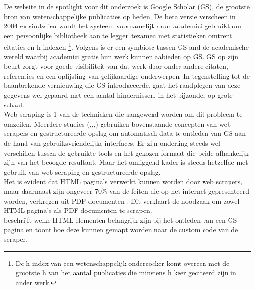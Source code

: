 De website in de spotlight voor dit onderzoek is Google Scholar (GS), de grootste bron van wetenschappelijke publicaties op heden. De beta versie verscheen in 2004 en sindsdien wordt het systeem voornamelijk door academici gebruikt om een persoonlijke bibliotheek aan te leggen tezamen met statistieken omtrent citaties en h-indexen \footnote{De h-index van een wetenschappelijk onderzoeker komt overeen met de grootste h van het aantal publicaties die minstens h keer geciteerd zijn in ander werk.}. Volgens \textcite{Oh2019} is er een symbiose tussen GS and de academische wereld waarbij academici gratis hun werk kunnen aabieden op GS. GS op zijn beurt zorgt voor goede visibiliteit van dat werk door onder andere citaten, referenties en een oplijsting van gelijkaardige onderwerpen. In tegenstelling tot de baanbrekende vernieuwing die GS introduceerde, gaat het raadplegen van deze gegevens wel gepaard met een aantal hindernissen, in het bijzonder op grote schaal.\\
Web scraping is 1 van de technieken die aangewend worden om dit probleem te omzeilen. Meerdere studies (\autocite{Pratiba2018},\autocite{Rafsanjani2022},\autocite{Amin2024},\autocite{Sulistya2024}) gebruiken bovenstaande concepten van web scrapers en gestructureerde opslag om automatisch data te ontleden van GS aan de hand van gebruiksvriendelijke interfaces. Er zijn onderling steeds wel verschillen tussen de gebruikte tools en het gekozen formaat die beide afhankelijk zijn van het beoogde resultaat. Maar het omliggend kader is steeds hetzelfde met gebruik van web scraping en gestructureerde opslag.\\
Het is evident dat HTML pagina's verwerkt kunnen worden door web scrapers, maar daarnaast zijn ongeveer 70\% van de feiten die op het internet gepresenteerd worden, verkregen uit PDF-documenten \autocite{Singrodia2019}. Dit verklaart de noodzaak om zowel HTML pagina's als PDF documenten te scrapen.\\
\textcite{Yang2017} beschrijft welke HTML elementen belangrijk zijn bij het ontleden van een GS pagina en \textcite{Rahmatulloh2020} toont hoe deze kunnen gemapt worden naar de custom code van de scraper.\\

